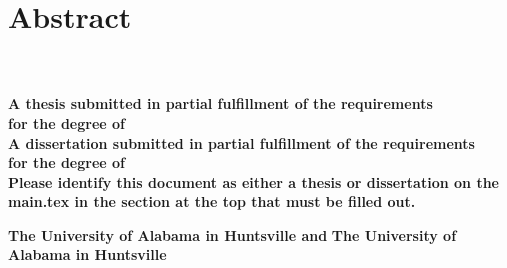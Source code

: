
\chapter{Abstract}
     \begin{center}
        \large
        \singlespacing
        \textbf{\thesistitle}\\
        \vspace{0.5cm}
        \large
        \textbf{\studentname}\\
        \vspace{0.5cm}
        \normalsize
        \ifdefined\thesis
        \textbf{A thesis submitted in partial fulfillment of the requirements \\for the degree of \degree}\\  
        \else
        \ifdefined\dissertation
        \textbf{A dissertation submitted in partial fulfillment of the requirements \\for the degree of \degree}\\ 
        \else
        \textbf{Please identify this document as either a thesis or dissertation on the main.tex in the section at the top that must be filled out.}\\
    \fi
    \fi
        \vspace{1cm}
        \textbf{\department}
        
        \vspace{0.25cm}

        \ifdefined\jointuni
        \textbf{The University of Alabama in Huntsville and  \jointuni}
        \else
        \textbf{The University of Alabama in Huntsville}
    \fi

        
        \vspace{0.1cm}
        \textbf{\gradmonth\ \gradyear}
        


    \end{center}
\vspace{0.1cm}

